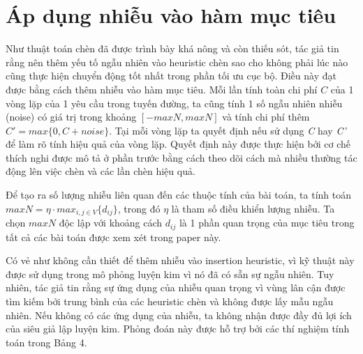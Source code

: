 \section{Áp dụng nhiễu vào hàm mục tiêu}
Như thuật toán chèn đã được trình bày khá nông và còn thiếu sót, tác giả tin rằng nên thêm yếu tố ngẫu nhiên vào heuristic chèn sao cho không phải lúc nào cũng thực hiện chuyển động tốt nhất trong phần tối ưu cục bộ. Điều này đạt được bằng cách thêm nhiễu vào hàm mục tiêu. Mỗi lần tính toàn chi phí $C$ của 1 vòng lặp của 1 yêu cầu trong tuyến đường, ta cũng tính 1 số ngẫu nhiên nhiễu (noise) có giá trị trong khoảng $\left[ -maxN, maxN \right]$ và tính chi phí thêm $C'=max\{ 0, C+noise \}$. Tại mỗi vòng lặp ta quyết định nếu sử dụng \textit{C} hay \textit{C'} để làm rõ tính hiệu quả của vòng lặp. Quyết định này được thực hiện bởi cơ chế thích nghi được mô tả ở phần trước bằng cách theo dõi cách mà nhiều thường tác động lên việc chèn và các lần chèn hiệu quả.

Để tạo ra số lượng nhiễu liên quan đến các thuộc tính của bài toán, ta tính toán $maxN = \eta\cdot max_{i,j \in V} \{d_{ij}\}$, trong đó $\eta$ là tham số điều khiển lượng nhiễu. Ta chọn $maxN$ độc lập với khoảng cách $d_{ij}$ là 1 phần quan trọng của mục tiêu trong tất cả các bài toán được xem xét trong paper này.

Có vẻ như không cần thiết để thêm nhiễu vào insertion heuristic, vì kỹ thuật này được sử dụng trong mô phỏng luyện kim vì nó đã có sẵn sự ngẫu nhiên. Tuy nhiên, tác giả tin rằng sự ứng dụng của nhiễu quan trọng vì vùng lân cận được tìm kiếm bởi trung bình của các heuristic chèn và không được lấy mẫu ngẫu nhiên. Nếu không có các ứng dụng của nhiễu, ta không nhận được đầy đủ lợi ích của siêu giả lập luyện kim. Phỏng đoán này được hỗ trợ bởi các thí nghiệm tính toán trong Bảng 4.
